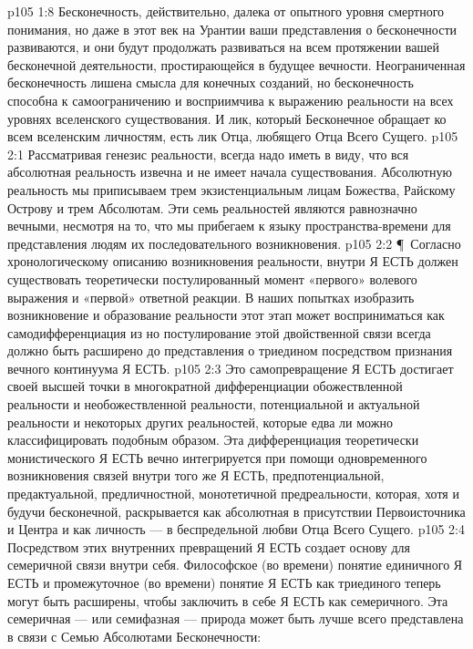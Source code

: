 \vs p105 1:8 Бесконечность, действительно, далека от опытного уровня смертного понимания, но даже в этот век на Урантии ваши представления о бесконечности развиваются, и они будут продолжать развиваться на всем протяжении вашей бесконечной деятельности, простирающейся в будущее вечности. Неограниченная бесконечность лишена смысла для конечных созданий, но бесконечность способна к самоограничению и восприимчива к выражению реальности на всех уровнях вселенского существования. И лик, который Бесконечное обращает ко всем вселенским личностям, есть лик Отца, любящего Отца Всего Сущего.
\vs p105 2:1 Рассматривая генезис реальности, всегда надо иметь в виду, что вся абсолютная реальность извечна и не имеет начала существования. Абсолютную реальность мы приписываем трем экзистенциальным лицам Божества, Райскому Острову и трем Абсолютам. Эти семь реальностей являются равнозначно вечными, несмотря на то, что мы прибегаем к языку пространства\hyp{}времени для представления людям их последовательного возникновения.
\vs p105 2:2 \P\ Согласно хронологическому описанию возникновения реальности, внутри Я ЕСТЬ должен существовать теоретически постулированный момент «первого» волевого выражения и «первой» ответной реакции. В наших попытках изобразить возникновение и образование реальности этот этап может восприниматься как самодифференциация  из  но постулирование этой двойственной связи всегда должно быть расширено до представления о триедином посредством признания вечного континуума  Я ЕСТЬ.
\vs p105 2:3 Это самопревращение Я ЕСТЬ достигает своей высшей точки в многократной дифференциации обожествленной реальности и необожествленной реальности, потенциальной и актуальной реальности и некоторых других реальностей, которые едва ли можно классифицировать подобным образом. Эта дифференциация теоретически монистического Я ЕСТЬ вечно интегрируется при помощи одновременного возникновения связей внутри того же Я ЕСТЬ, предпотенциальной, предактуальной, предличностной, монотетичной предреальности, которая, хотя и будучи бесконечной, раскрывается как абсолютная в присутствии Первоисточника и Центра и как личность --- в беспредельной любви Отца Всего Сущего.
\vs p105 2:4 Посредством этих внутренних превращений Я ЕСТЬ создает основу для семеричной связи внутри себя. Философское (во времени) понятие единичного Я ЕСТЬ и промежуточное (во времени) понятие Я ЕСТЬ как триединого теперь могут быть расширены, чтобы заключить в себе Я ЕСТЬ как семеричного. Эта семеричная --- или семифазная --- природа может быть лучше всего представлена в связи с Семью Абсолютами Бесконечности:
